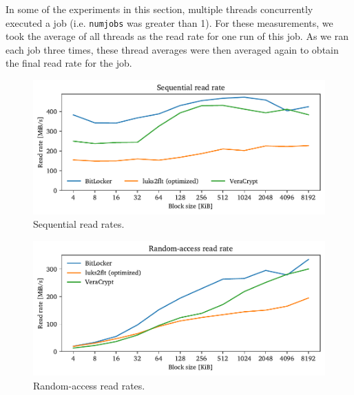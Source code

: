 In some of the experiments in this section, multiple threads concurrently executed a job (i.e. \texttt{numjobs} was greater than 1). For these measurements, we took the average of all threads as the read rate for one run of this job. As we ran each job three times, these thread averages were then averaged again to obtain the final read rate for the job.




\begin{figure}[htb!]
	\center
	\includegraphics[scale=1]{../fig/performance.hwexperiments.optseq.pdf}
	\caption[
		Sequential read rates
	]{
		Sequential read rates. 
	}
	\label{fig:performance.hwexperiments.optseq}
\end{figure}

\begin{figure}[htb!]
	\center
	\includegraphics[scale=1]{../fig/performance.hwexperiments.optrand.pdf}
	\caption[
		Random-access read rates
	]{
		Random-access read rates. 
	}
	\label{fig:performance.hwexperiments.optrand}
\end{figure}

